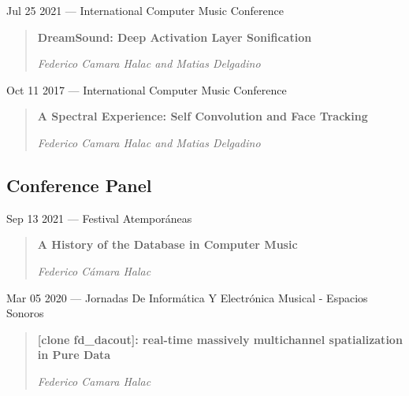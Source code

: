 \documentclass[12pt,overlapped]{res}%
\begin{document}
\begin{resume}
\begin{quote}
\end{quote}%
%
%
%
Jul 25 2021 --- International Computer Music Conference%
\begin{quote}
\par
\textbf{DreamSound: Deep Activation Layer Sonification}
\par
\textit{Federico Camara Halac and Matias Delgadino}

\end{quote}%

%
%
%



Oct 11 2017 --- International Computer Music Conference%
\begin{quote}
\par
\textbf{A Spectral Experience: Self Convolution and Face Tracking}
\par
\textit{Federico Camara Halac and Matias Delgadino}

\end{quote}%
%
%
%
\subsection{Conference Panel}%

Sep 13 2021 --- Festival Atemporáneas%
\begin{quote}
\par
\textbf{A History of the Database in Computer Music}
\par
\textit{Federico Cámara Halac}

\end{quote}%
Mar 05 2020 --- Jornadas De Informática Y Electrónica Musical - Espacios Sonoros%
\begin{quote}
\par
\textbf{{[}clone fd\_dacout{]}: real{-}time massively multichannel spatialization in Pure Data}
\par
\textit{Federico Camara Halac}


\end{quote}
\end{resume}
\end{document}
